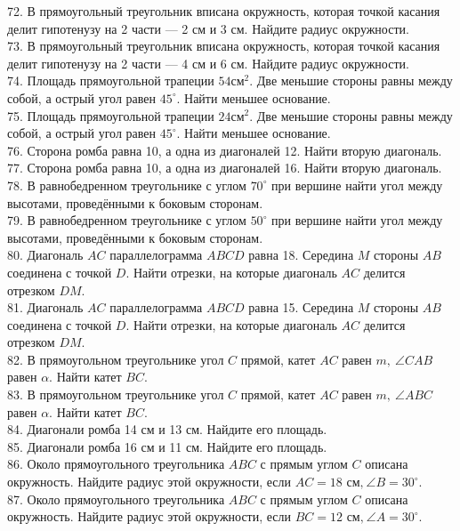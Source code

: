 \documentclass[12pt]{article}
\begin{document}
72. В прямоугольный треугольник вписана окружность, которая точкой касания делит гипотенузу на 2 части --- 2 см и 3 см. Найдите радиус окружности.\\
73. В прямоугольный треугольник вписана окружность, которая точкой касания делит гипотенузу на 2 части --- 4 см и 6 см. Найдите радиус окружности.\\
74. Площадь прямоугольной трапеции $54\text{см}^2.$ Две меньшие стороны равны между собой, а острый угол равен $45^\circ.$ Найти меньшее основание.\\
75. Площадь прямоугольной трапеции $24\text{см}^2.$ Две меньшие стороны равны между собой, а острый угол равен $45^\circ.$ Найти меньшее основание.\\
76. Сторона ромба равна 10, а одна из диагоналей 12. Найти вторую диагональ.\\
77. Сторона ромба равна 10, а одна из диагоналей 16. Найти вторую диагональ.\\
78. В равнобедренном треугольнике с углом $70^\circ$ при вершине найти угол между высотами, проведёнными к боковым сторонам.\\
79. В равнобедренном треугольнике с углом $50^\circ$ при вершине найти угол между высотами, проведёнными к боковым сторонам.\\
80. Диагональ $AC$ параллелограмма $ABCD$ равна 18. Середина $M$ стороны $AB$ соединена с точкой $D.$ Найти отрезки, на которые диагональ $AC$ делится отрезком $DM.$\\
81. Диагональ $AC$ параллелограмма $ABCD$ равна 15. Середина $M$ стороны $AB$ соединена с точкой $D.$ Найти отрезки, на которые диагональ $AC$ делится отрезком $DM.$\\
82. В прямоугольном треугольнике угол $C$ прямой, катет $AC$ равен $m,\ \angle CAB$ равен $\alpha.$ Найти катет $BC.$\\
83. В прямоугольном треугольнике угол $C$ прямой, катет $AC$ равен $m,\ \angle ABC$ равен $\alpha.$ Найти катет $BC.$\\
84. Диагонали ромба 14 см и 13 см. Найдите его площадь.\\
85. Диагонали ромба 16 см и 11 см. Найдите его площадь.\\
86. Около прямоугольного треугольника $ABC$ с прямым углом $C$ описана окружность. Найдите радиус этой окружности, если $AC=18\text{ см,}\ \angle B=30^\circ.$\\
87. Около прямоугольного треугольника $ABC$ с прямым углом $C$ описана окружность. Найдите радиус этой окружности, если $BC=12\text{ см,}\ \angle A=30^\circ.$\\
\end{document}
